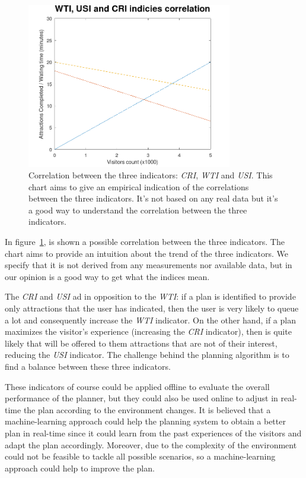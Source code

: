 \begin{figure}[H]
	\centering
	\includegraphics[width=0.8\textwidth]{img/indiciescorrelation.png}
	\caption{Correlation between the three indicators: \textit{CRI}, \textit{WTI} and \textit{USI}. This chart aims to give an empirical indication of the correlations between the three indicators. It's not based on any real data but it's a good way to understand the correlation between the three indicators.}
	\label{fig:indicies}
\end{figure}

In figure~\ref{fig:indicies}, is shown a possible correlation between the three indicators. The chart aims to provide an intuition about the trend of
the three indicators. We specify that it is not derived from any measurements nor available data, but in our opinion is a good way to get what the
indices mean.

The \textit{CRI} and \textit{USI} ad in opposition to the \textit{WTI}: if a plan is identified to provide only attractions that the user has
indicated, then the user is very likely to queue a lot and consequently increase the \textit{WTI} indicator. On the other hand, if a plan maximizes
the visitor's experience (increasing the \textit{CRI} indicator), then is quite likely that will be offered to them attractions that are not of their
interest, reducing the \textit{USI} indicator. The challenge behind the planning algorithm is to find a balance between these three indicators.

These indicators of course could be applied offline to evaluate the overall performance of the planner, but they could also be used online to adjust
in real-time the plan according to the environment changes. It is believed that a machine-learning approach could help the planning system to obtain
a better plan in real-time since it could learn from the past experiences of the visitors and adapt the plan accordingly. Moreover, due to the
complexity of the environment could not be feasible to tackle all possible scenarios, so a machine-learning approach could help to improve the plan.

